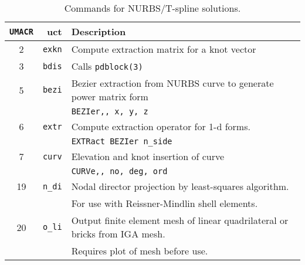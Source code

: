 
\begin{table}[h]
\begin{center}
\begin{tabular}{| c | r | p{11cm}|} \hline
\texttt{UMACR} & uct & Description \\ \hline
 2 & \texttt{exkn} & Compute extraction matrix for a knot vector \\
 3 & \texttt{bdis} & Calls  \texttt{pdblock(3)} \\
 5 & \texttt{bezi} & Bezier extraction from NURBS curve to generate power matrix form\\
& & \texttt{BEZIer,, x, y, z} \\
 6 & \texttt{extr} & Compute extraction operator for 1-d forms. \\
& & \texttt{EXTRact BEZIer n\_side} \\
 7 & \texttt{curv} & Elevation and knot insertion of curve \\
& & \texttt{CURVe,, no, deg, ord }\\
19 & \texttt{n\_di} &  Nodal director projection by least-squares algorithm. \\
   &  & For use with Reissner-Mindlin shell elements. \\
20 & \texttt{o\_li} &  Output finite element mesh of linear quadrilateral or
bricks from IGA mesh. \\
& & Requires plot of mesh before use. \\
\hline
\end{tabular}
\caption{Commands for NURBS/T-spline solutions. \label{tab1iga} }
\end{center}
\end{table}

